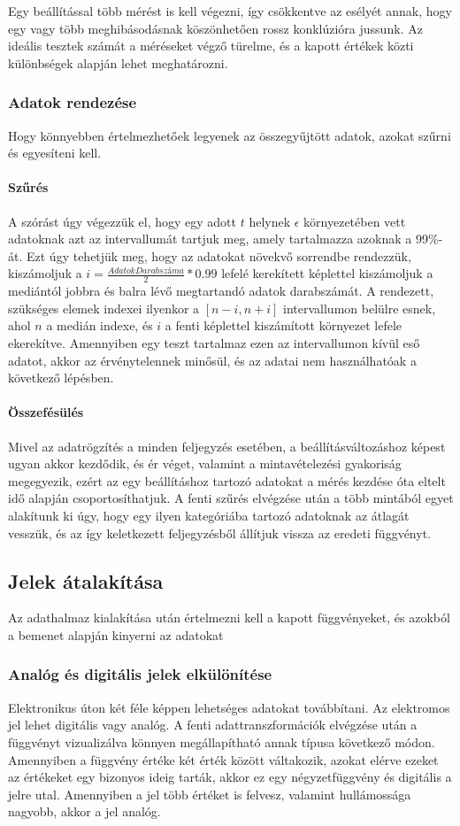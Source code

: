 Egy beállítással több mérést is kell végezni, így csökkentve az esélyét annak, hogy egy vagy több meghibásodásnak köszönhetően rossz konklúzióra jussunk. Az ideális tesztek számát a méréseket végző türelme, és a kapott értékek közti különbségek alapján lehet meghatározni.

\subsubsection{Adatok rendezése}
Hogy könnyebben értelmezhetőek legyenek az összegyűjtött adatok, azokat szűrni és egyesíteni kell.
\paragraph{Szűrés}
A szórást úgy végezzük el, hogy egy adott $t$ helynek $\epsilon$ környezetében vett adatoknak azt az intervallumát tartjuk meg, amely tartalmazza azoknak a 99\%-át. Ezt úgy tehetjük meg, hogy az adatokat növekvő sorrendbe rendezzük, kiszámoljuk a $i = \frac{AdatokDarabszáma}{2}*0.99$ lefelé kerekített képlettel kiszámoljuk a mediántól jobbra és balra lévő megtartandó adatok darabszámát. A rendezett, szükséges elemek indexei ilyenkor a $[n-i,n+i]$ intervallumon belülre esnek, ahol $n$ a medián indexe, és $i$ a fenti képlettel kiszámított környezet lefele ekerekítve. Amennyiben egy teszt tartalmaz ezen az intervallumon kívül eső adatot, akkor az érvénytelennek minősül, és az adatai nem használhatóak a következő lépésben.
\paragraph{Összefésülés}
Mivel az adatrögzítés a minden feljegyzés esetében, a beállításváltozáshoz képest ugyan akkor kezdődik, és ér véget, valamint a mintavételezési gyakoriság megegyezik, ezért az egy beállításhoz tartozó adatokat a mérés kezdése óta eltelt idő alapján csoportosíthatjuk. A fenti szűrés elvégzése után a több mintából egyet alakítunk ki úgy, hogy egy ilyen kategóriába tartozó adatoknak az átlagát vesszük, és az így keletkezett feljegyzésből állítjuk vissza az eredeti függvényt.

\subsection{Jelek átalakítása}
Az adathalmaz kialakítása után értelmezni kell a kapott függvényeket, és azokból a bemenet alapján kinyerni az adatokat
\subsubsection{Analóg és digitális jelek elkülönítése}
Elektronikus úton két féle képpen lehetséges adatokat továbbítani. Az elektromos jel lehet digitális vagy analóg. A fenti adattranszformációk elvégzése után a függvényt vizualizálva könnyen megállapítható annak típusa következő módon. Amennyiben a függvény értéke két érték között váltakozik, azokat elérve ezeket az értékeket egy bizonyos ideig tarták, akkor ez egy négyzetfüggvény és digitális a jelre utal. Amennyiben a jel több értéket is felvesz, valamint hullámossága nagyobb, akkor a jel analóg.

